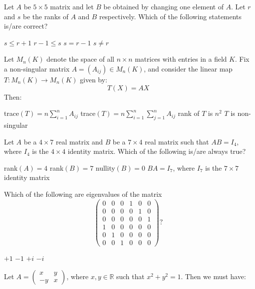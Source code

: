 \documentclass[10pt]{exam}
\begin{document}
\begin{questions}
\question
Let $A$ be $5 \times 5$ matrix and let $B$ be obtained by changing one element of $A$. Let $r$ and $s$ be the ranks of $A$ and $B$ respectively. Which of the following statements is/are correct?

\begin{checkboxes}
\choice $s \leq r + 1 $ 
\choice $r -1  \leq s $
\choice $ s = r - 1 $ 
\choice $ s \neq r $ 
\end{checkboxes} 

\question
Let $M_n(K)$ denote the space of all $n\times n$ matrices with entries in a field $K$. Fix a non-singular matrix $A = (A_{ij}) \in M_n(K)$, and consider the linear map $ T: M_n(K) \rightarrow M_n(K)$ given by:
$$ T(X) = AX $$
Then:

\begin{checkboxes}
\choice trace$(T) = n \sum_{i = 1 }^n A_{ij}$
\choice trace$(T) = n \sum_{i = 1 }^n \sum_{j = 1}^n A_{ij}$
\choice rank of $T$ is $n ^2$ 
\choice $T$ is non-singular
\end{checkboxes}


\question
Let $A$ be a $4 \times 7$ real matrix and $B$ be a $7 \times 4$ real matrix such that $AB = I_4$, where $I_4$ is the $4 \times 4 $ identity matrix. Which of the following is/are always true?

\begin{checkboxes}
\choice rank$(A) = 4 $
\choice rank$(B) = 7 $
\choice nullity$(B) = 0 $
\choice $BA = I_7 $, where $I_7$ is the $7 \times 7$ identity matrix
\end{checkboxes} 

\question
Which of the following are eigenvalues of the matrix 
$$
\begin{pmatrix} 
0 & 0 & 0 & 1 & 0 & 0 \\
0 & 0 & 0 & 0 & 1 & 0 \\
0 & 0 & 0 & 0 & 0 & 1 \\
1 & 0 & 0 & 0 & 0 & 0 \\
0 & 1 & 0 & 0 & 0 & 0 \\
0 & 0 & 1 & 0 & 0 & 0
\end{pmatrix}?
$$

\begin{oneparcheckboxes}
\choice $+1$ 
\choice $-1$ 
\choice $+i$ 
\choice $-i$ 
\end{oneparcheckboxes}

\question
Let $A = \begin{pmatrix} x & y \\ -y & x \end{pmatrix}$, where $x , y \in \mathbb{R}$ such that $x^2 + y^2 = 1$. Then we must have:


\end{questions}
\end{document}

